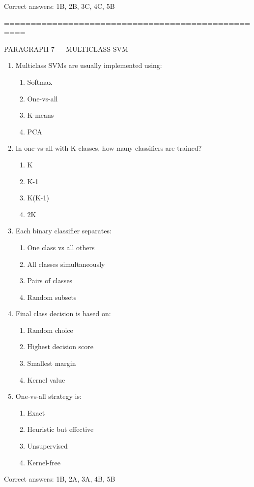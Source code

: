 \documentclass{article}
\begin{document}
	Correct answers: 1B, 2B, 3C, 4C, 5B
	
	\bigskip
	==================================================
	
	PARAGRAPH 7 — MULTICLASS SVM
	
	\begin{enumerate}
		\item Multiclass SVMs are usually implemented using:
		\begin{enumerate}
			\item Softmax
			\item One-vs-all
			\item K-means
			\item PCA
		\end{enumerate}
		
		\item In one-vs-all with K classes, how many classifiers are trained?
		\begin{enumerate}
			\item K
			\item K-1
			\item K(K-1)
			\item 2K
		\end{enumerate}
		
		\item Each binary classifier separates:
		\begin{enumerate}
			\item One class vs all others
			\item All classes simultaneously
			\item Pairs of classes
			\item Random subsets
		\end{enumerate}
		
		\item Final class decision is based on:
		\begin{enumerate}
			\item Random choice
			\item Highest decision score
			\item Smallest margin
			\item Kernel value
		\end{enumerate}
		
		\item One-vs-all strategy is:
		\begin{enumerate}
			\item Exact
			\item Heuristic but effective
			\item Unsupervised
			\item Kernel-free
		\end{enumerate}
	\end{enumerate}
	
	Correct answers: 1B, 2A, 3A, 4B, 5B
	
\end{document}
